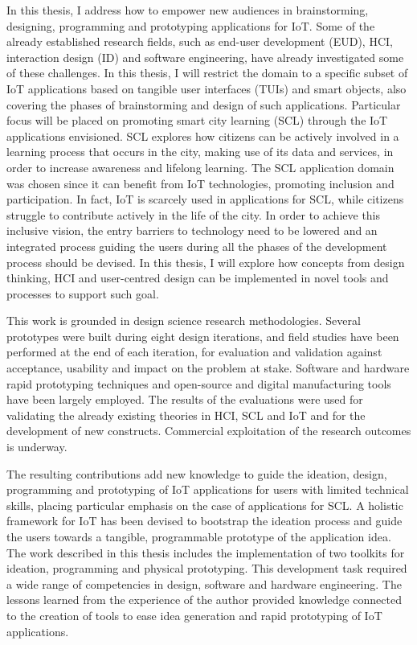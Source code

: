 In this thesis, I address how to empower new audiences in brainstorming, designing, programming and prototyping applications for IoT. Some of the already established research fields, such as end-user development (EUD), HCI, interaction design (ID) and software engineering, have already investigated some of these challenges. In this thesis, I will restrict the domain to a specific subset of IoT applications based on tangible user interfaces (TUIs) and smart objects, also covering the phases of brainstorming and design of such applications. Particular focus will be placed on promoting smart city learning (SCL) through the IoT applications envisioned. SCL explores how citizens can be actively involved in a learning process that occurs in the city, making use of its data and services, in order to increase awareness and lifelong learning. The SCL application domain was chosen since it can benefit from IoT technologies, promoting inclusion and participation. In fact, IoT is scarcely used in applications for SCL, while citizens struggle to contribute actively in the life of the city. In order to achieve this inclusive vision, the entry barriers to technology need to be lowered and an integrated process guiding the users during all the phases of the development process should be devised. In this thesis, I will explore how concepts from design thinking, HCI and user-centred design can be implemented in novel tools and processes to support such goal.

This work is grounded in design science research methodologies. Several prototypes were built during eight design iterations, and field studies have been performed at the end of each iteration, for evaluation and validation against acceptance, usability and impact on the problem at stake. Software and hardware rapid prototyping techniques and open-source and digital manufacturing tools have been largely employed. The results of the evaluations were used for validating the already existing theories in HCI, SCL and IoT and for the development of new constructs. Commercial exploitation of the research outcomes is underway.

The resulting contributions add new knowledge to guide the ideation, design, programming and prototyping of IoT applications for users with limited technical skills, placing particular emphasis on the case of applications for SCL. A holistic framework for IoT has been devised to bootstrap the ideation process and guide the users towards a tangible, programmable prototype of the application idea. The work described in this thesis includes the implementation of two toolkits for ideation, programming and physical prototyping. This development task required a wide range of competencies in design, software and hardware engineering. The lessons learned from the experience of the author provided knowledge connected to the creation of tools to ease idea generation and rapid prototyping of IoT applications.
